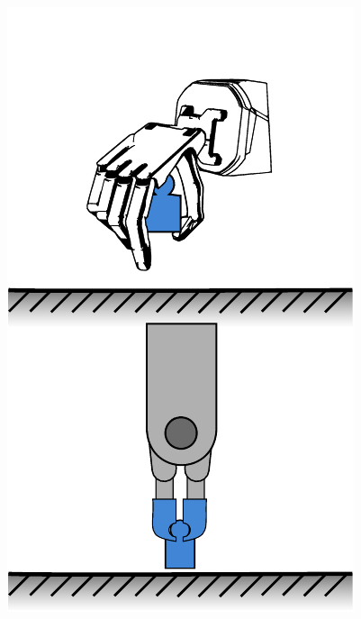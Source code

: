 \begin{figure}[h]
\begin{center}
\begin{minipage}{.24\linewidth}
			\includegraphics[width=.95\textwidth]{chapters/introduction/fig/pipeline-2.pdf}
		\end{minipage}%
		\hfill%
		\begin{minipage}{.24\linewidth}
			\vspace{0pt}
			\centering

\end{minipage}
\end{center}
\end{figure}
